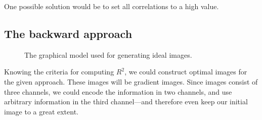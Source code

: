 
One possible solution would be to set all correlations to a high
value.


\subsection{The backward approach}

\begin{figure}[h]
  \centering
  \caption{The graphical model used for generating ideal images.}
\end{figure}

Knowing the criteria for computing $R^2$, we could construct optimal
images for the given approach. These images will be gradient
images. Since images consist of three channels, we could encode the
information in two channels, and use arbitrary information in the
third channel---and therefore even keep our initial image to a great
extent.

